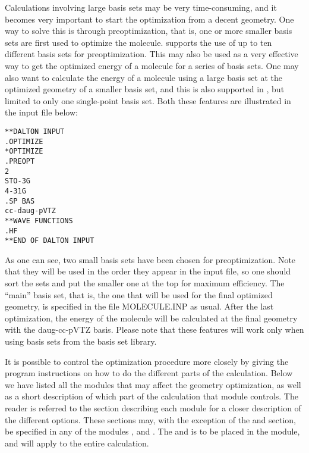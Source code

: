 Calculations involving large basis sets may be very time-consuming,
and it becomes very important to start the optimization from a decent
geometry. One way to solve this is through
preoptimization,
that is, one or more smaller basis sets are first used to optimize the
molecule.  supports the use of up to ten different
basis sets for preoptimization. This may also be used as a very
effective way to get the optimized energy of a molecule for a series
of basis sets. One may also want to calculate the energy of a molecule
using a large basis set at the optimized geometry of a smaller basis
set, and this is also supported in {\dalton}, but limited to only one
single-point basis set. Both these features are illustrated in the
input file below:

\begin{verbatim}
**DALTON INPUT
.OPTIMIZE
*OPTIMIZE
.PREOPT
2
STO-3G
4-31G
.SP BAS
cc-daug-pVTZ
**WAVE FUNCTIONS
.HF
**END OF DALTON INPUT
\end{verbatim}

As one can see, two small basis sets have been chosen 
for
preoptimization. Note that they will be
used in the order they appear in the input file, so one should
sort the sets and put the smaller one at the top for maximum
efficiency. The ``main'' basis set, that is, the one that will be
used for the final optimized geometry, is specified in the file
MOLECULE.INP as usual. After the last optimization, the energy of
the molecule will be calculated at the final geometry with the
daug-cc-pVTZ basis. Please note that these features will work only
when using basis sets from the basis set library.

It is possible to control the optimization procedure more closely
by giving the program instructions on how to do the different parts of
the calculation. Below we have listed all the modules that may
affect the geometry optimization, as well as a short description of
which part of the calculation that module controls. The reader is
referred to the section describing each module for a closer
description of the different options. These sections may, with the
exception of the  and  section, be specified
in any of the modules , 
and . The  and  is
to be placed in the  module, and will apply to the
entire calculation.

